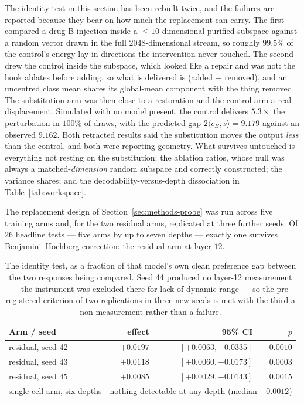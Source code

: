 The identity test in this section has been rebuilt twice, and the failures are reported because
they bear on how much the replacement can carry. The first compared a drug-B injection inside a
$\leq 10$-dimensional purified subspace against a random vector drawn in the full
$2048$-dimensional stream, so roughly $99.5\%$ of the control's energy lay in directions the
intervention never touched. The second drew the control inside the subspace, which looked like a
repair and was not: the hook ablates before adding, so what is delivered is (added $-$ removed),
and an uncentred class mean shares its global-mean component with the thing removed. The
substitution arm was then close to a restoration and the control arm a real displacement. Simulated
with no model present, the control delivers $5.3\times$ the perturbation in $100\%$ of draws, with
the predicted gap $2\langle c_B, s\rangle = 9.179$ against an observed $9.162$. Both retracted
results said the substitution moves the output \emph{less} than the control, and both were
reporting geometry. What survives untouched is everything not resting on the substitution: the
ablation ratios, whose null was always a matched-\emph{dimension} random subspace and correctly
constructed; the variance shares; and the decodability-versus-depth dissociation in
Table~\ref{tab:workspace}.

The replacement design of Section~\ref{sec:methods-probe} was run across five training arms and,
for the two residual arms, replicated at three further seeds. Of $26$ headline tests --- five arms
by up to seven depths --- exactly one survives Benjamini--Hochberg correction: the residual arm at
layer $12$.

\begin{table}[h]
\centering
\begin{tabular}{lrrr}
\toprule
Arm / seed & effect & 95\% CI & $p$ \\
\midrule
residual, seed 42 & $+0.0197$ & $[+0.0063, +0.0335]$ & $0.0010$ \\
residual, seed 43 & $+0.0118$ & $[+0.0060, +0.0173]$ & $0.0003$ \\
residual, seed 45 & $+0.0085$ & $[+0.0029, +0.0143]$ & $0.0015$ \\
\midrule
single-cell arm, six depths & \multicolumn{3}{l}{nothing detectable at any depth (median $-0.0012$)} \\
\bottomrule
\end{tabular}
\caption{The identity test, as a fraction of that model's own clean preference gap between the two
responses being compared. Seed 44 produced no layer-12 measurement --- the instrument was excluded
there for lack of dynamic range --- so the pre-registered criterion of two replications in three new
seeds is met with the third a non-measurement rather than a failure.}
\label{tab:identity}
\end{table}

